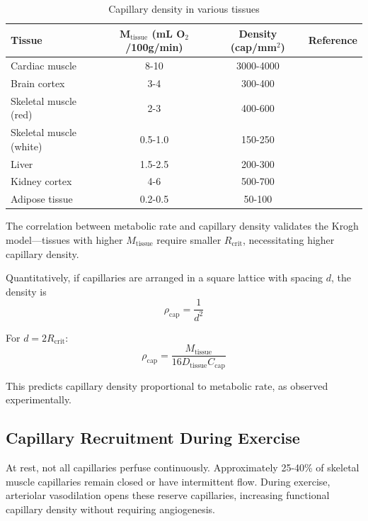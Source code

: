 \documentclass[10pt,twocolumn,a4paper]{article}
\theoremstyle{remark}
\begin{document}
\begin{table}[h]
\centering
\caption{Capillary density in various tissues}
\label{tab:capillary_density}
\begin{tabular}{lccc}
\toprule
\textbf{Tissue} & \textbf{$\boldsymbol{M_{\mathrm{tissue}}}$ (mL O$_{2}$/100g/min)} & \textbf{Density (cap/mm$^{2}$)} & \textbf{Reference} \\
\midrule
Cardiac muscle & 8-10 & 3000-4000 & \cite{rakusan1971quantitative} \\
Brain cortex & 3-4 & 300-400 & \cite{pawlik1981quantitative} \\
Skeletal muscle (red) & 2-3 & 400-600 & \cite{hudlicka1992muscle} \\
Skeletal muscle (white) & 0.5-1.0 & 150-250 & \cite{hudlicka1992muscle} \\
Liver & 1.5-2.5 & 200-300 & \cite{rappaport1973hepatic} \\
Kidney cortex & 4-6 & 500-700 & \cite{beeuwkes1975renal} \\
Adipose tissue & 0.2-0.5 & 50-100 & \cite{crandall1997microvascular} \\
\bottomrule
\end{tabular}
\end{table}

The correlation between metabolic rate and capillary density validates the Krogh model—tissues with higher $M_{\mathrm{tissue}}$ require smaller $R_{\mathrm{crit}}$, necessitating higher capillary density.

Quantitatively, if capillaries are arranged in a square lattice with spacing $d$, the density is
\begin{equation}
\rho_{\mathrm{cap}} = \frac{1}{d^{2}}
\end{equation}

For $d = 2R_{\mathrm{crit}}$:
\begin{equation}
\rho_{\mathrm{cap}} = \frac{M_{\mathrm{tissue}}}{16D_{\mathrm{tissue}} C_{\mathrm{cap}}}
\end{equation}

This predicts capillary density proportional to metabolic rate, as observed experimentally.

\subsection{Capillary Recruitment During Exercise}

At rest, not all capillaries perfuse continuously. Approximately 25-40\% of skeletal muscle capillaries remain closed or have intermittent flow. During exercise, arteriolar vasodilation opens these reserve capillaries, increasing functional capillary density without requiring angiogenesis.
\end{document}
